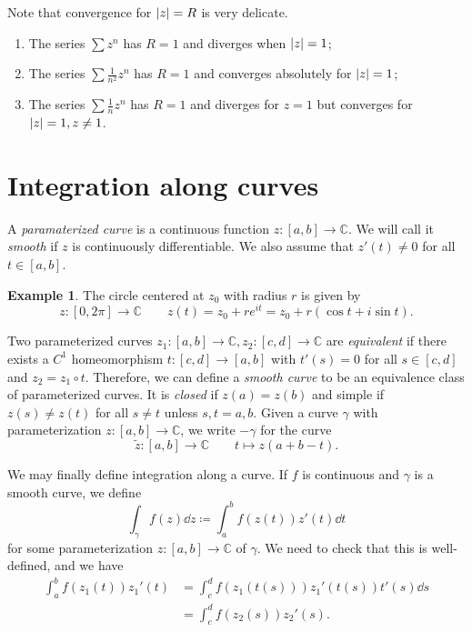 \documentclass[leqno, openany]{memoir}
\theoremstyle{definition}
\newtheorem{exm}[thm]{Example}
\theoremstyle{remark}
\theoremstyle{plain}
\theoremstyle{definition}
\theoremstyle{remark}
\newcommand{\C}{\mathbb{C}}
\newcommand{\wt}[1]{\widetilde{#1}}
\begin{document}
Note that convergence for $\abs{z} = R$ is very delicate.
\begin{enumerate}
    \item The series $\sum z^n$ has $R = 1$ and diverges when $\abs{z} = 1$;
    \item The series $\sum \frac{1}{n^2} z^n$ has $R = 1$ and converges absolutely for $\abs{z} = 1$;
    \item The series $\sum \frac{1}{n} z^n$ has $R = 1$ and diverges for $z = 1$ but converges for $\abs{z} = 1, z \neq 1$.
\end{enumerate}

\section{Integration along curves}%
\label{sec:integration_along_curves}

A \textit{paramaterized curve} is a continuous function $z \colon [a,b] \to \C$. We will call it \textit{smooth} if $z$ is continuously differentiable. We also assume that $z'(t) \neq 0$ for all $t \in [a,b]$.

\begin{exm}
    The circle centered at $z_0$ with radius $r$ is given by
    \[ z \colon [0, 2\pi] \to \C \qquad z(t) = z_0 + re^{it} = z_0 + r (\cos t + i \sin t). \]
\end{exm}
Two parameterized curves $z_1 \colon [a,b] \to \C, z_2 \colon [c,d] \to \C$ are \textit{equivalent} if there exists a $C^1$ homeomorphism $t \colon [c,d] \to [a,b]$ with $t'(s) = 0$ for all $s \in [c,d]$ and $z_2 = z_1 \circ t$. Therefore, we can define a \textit{smooth curve} to be an equivalence class of parameterized curves. It is \textit{closed} if $z(a) = z(b)$ and simple if $z(s) \neq z(t)$ for all $s \neq t$ unless $s,t = a,b$. Given a curve $\gamma$ with parameterization $z \colon [a,b] \to \C$, we write $-\gamma$ for the curve
\[ \wt{z} \colon [a,b] \to \C \qquad t \mapsto z(a+b-t). \]

We may finally define integration along a curve. If $f$ is continuous and $\gamma$ is a smooth curve, we define
\[ \int_{\gamma} f(z) \dd{z} \coloneqq \int_a^b f(z(t)) z'(t) \dd{t} \]
for some parameterization $z \colon [a,b] \to \C$ of $\gamma$. We need to check that this is well-defined, and we have
\begin{align*}
    \int_a^b f(z_1(t)) z_1'(t) &= \int_c^d f(z_1(t(s))) z_1'(t(s)) t'(s) \dd{s} \\
                               &= \int_c^d f(z_2(s)) z_2'(s).
\end{align*}
\end{document}
